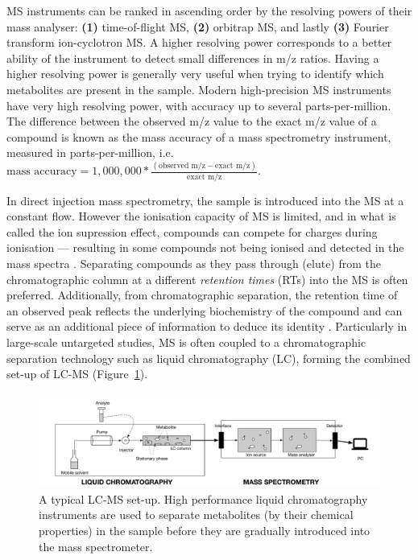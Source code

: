 MS instruments can be ranked in ascending order by the resolving powers of their mass analyser: \textbf{(1)} time-of-flight MS, \textbf{(2)} orbitrap MS, and lastly \textbf{(3)} Fourier transform ion-cyclotron MS. A higher resolving power corresponds to a better ability of the instrument to detect small differences in m/z ratios. Having a higher resolving power is generally very useful when trying to identify which metabolites are present in the sample. Modern high-precision MS instruments have very high resolving power, with accuracy up to several parts-per-million. The difference between the observed m/z value to the exact m/z value of a compound is known as the mass accuracy of a mass spectrometry instrument, measured in parts-per-million, i.e. $\text{mass accuracy} = 1,000,000 * \frac{(\text{observed m/z} - \text{exact m/z})}{\text{exact m/z}}$. 

In direct injection mass spectrometry, the sample is introduced into the MS at a constant flow. However the ionisation capacity of MS is limited, and in what is called the ion supression effect, compounds can compete for charges during ionisation --- resulting in some compounds not being ionised and detected in the mass spectra \cite{Smith2014}. Separating compounds as they pass through (elute) from the chromatographic column at a different \emph{retention times} (RTs) into the MS is often preferred. Additionally, from chromatographic separation, the retention time of an observed peak reflects the underlying biochemistry of the compound and can serve as an additional piece of information to deduce its identity \cite{Cao2015}. Particularly in large-scale untargeted studies, MS is often coupled to a chromatographic separation technology such as liquid chromatography (LC), forming the combined set-up of LC-MS (Figure~\ref{fig:LC-MS-setup}). 

\begin{figure}
\noindent \begin{centering}
\includegraphics[width=1.0\textwidth]{02-background/figures/LCMS}
\par\end{centering}
\caption[A typical LC-MS set-up.]{\label{fig:LC-MS-setup}A typical LC-MS set-up. High performance liquid chromatography instruments are used to separate metabolites (by their chemical properties) in the sample before they are gradually introduced into the mass spectrometer.}
\end{figure}


